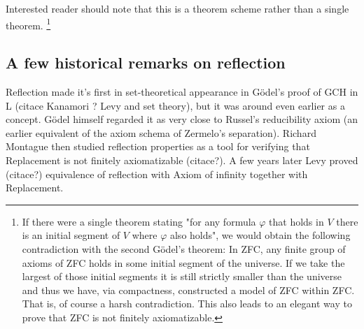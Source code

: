 \documentclass[12pt,a4paper]{article}
\begin{document}
\medskip 

Interested reader should note that this is a theorem scheme rather than a single theorem. \footnote{If there were a single theorem stating "for any formula $\varphi$ that holds in $V$ there is an initial segment of $V$ where $\varphi$ also holds", we would obtain the following contradiction with the second G{\"o}del's theorem: In ZFC, any finite group of axioms of ZFC holds in some initial segment of the universe. If we take the largest of those initial segments it is still strictly smaller than the universe and thus we have, via compactness, constructed a model of ZFC within ZFC. That is, of course a harsh contradiction. This also leads to an elegant way to prove that ZFC is not finitely axiomatizable.}

\medskip

\subsection{A few historical remarks on reflection}\label{sec:History}
 
 
Reflection made it's first in set-theoretical appearance in G{\"o}del's proof of GCH in L  (citace Kanamori ? Levy and set theory), but it was around even earlier as a concept. G{\"o}del himself regarded it as very close to Russel's reducibility axiom (an earlier equivalent of the axiom schema of Zermelo's separation). Richard Montague then studied reflection properties as a tool for verifying that Replacement is not finitely axiomatizable (citace?). A few years later Levy proved (citace?) equivalence of reflection with Axiom of infinity together with Replacement.
\end{document}
